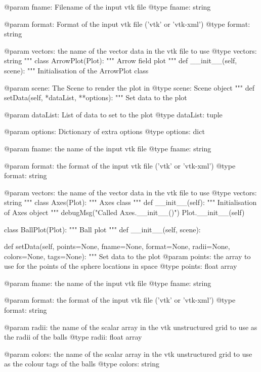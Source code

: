 \begin{python}
\begin{python}
\begin{verbose}
        @param fname: Filename of the input vtk file
        @type fname: string

        @param format: Format of the input vtk file ('vtk' or 'vtk-xml')
        @type format: string

	@param vectors: the name of the vector data in the vtk file to use
	@type vectors: string
        """
class ArrowPlot(Plot):
    """
    Arrow field plot
    """
    def __init__(self, scene):
        """
        Initialisation of the ArrowPlot class
        
        @param scene: The Scene to render the plot in
        @type scene: Scene object
        """
    def setData(self, *dataList, **options):
        """
        Set data to the plot

        @param dataList: List of data to set to the plot
        @type dataList: tuple

	@param options: Dictionary of extra options
	@type options: dict

	@param fname: the name of the input vtk file
	@type fname: string

	@param format: the format of the input vtk file ('vtk' or 'vtk-xml')
	@type format: string

	@param vectors: the name of the vector data in the vtk file to use
	@type vectors: string
        """
class Axes(Plot):
    """
    Axes class
    """
    def __init__(self):
        """
        Initialisation of Axes object
        """
        debugMsg("Called Axes.__init__()")
        Plot.__init__(self)

class BallPlot(Plot):
    """
    Ball plot
    """
    def __init__(self, scene):

    def setData(self, points=None, 
            fname=None, format=None,
            radii=None, colors=None, tags=None):
        """
        Set data to the plot
        @param points: the array to use for the points of the sphere
        locations in space
        @type points: float array

        @param fname: the name of the input vtk file
        @type fname: string

        @param format: the format of the input vtk file ('vtk' or 'vtk-xml')
        @type format: string

        @param radii: the name of the scalar array in the vtk unstructured
        grid to use as the radii of the balls
        @type radii: float array

        @param colors: the name of the scalar array in the vtk unstructured
        grid to use as the colour tags of the balls
        @type colors: string


\end{verbose}
\end{python}
\end{python}
